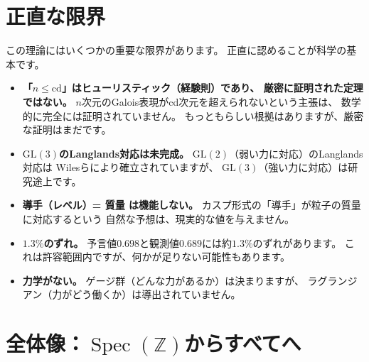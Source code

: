 \documentclass[12pt,a4paper]{article}
\newcommand{\Spec}{\operatorname{Spec}}
\begin{document}
\section{正直な限界}

\begin{honestbox}[科学は正直でなければならない]
この理論にはいくつかの重要な限界があります。
正直に認めることが科学の基本です。

\begin{itemize}
  \item \textbf{「$n \le \mathrm{cd}$」はヒューリスティック（経験則）であり、
    厳密に証明された定理ではない。}
    $n$次元のGalois表現がcd次元を超えられないという主張は、
    数学的に完全には証明されていません。
    もっともらしい根拠はありますが、厳密な証明はまだです。

  \item \textbf{$\mathrm{GL}(3)$のLanglands対応は未完成。}
    $\mathrm{GL}(2)$（弱い力に対応）のLanglands対応は
    Wilesらにより確立されていますが、
    $\mathrm{GL}(3)$（強い力に対応）は研究途上です。

  \item \textbf{導手（レベル）= 質量 は機能しない。}
    カスプ形式の「導手」が粒子の質量に対応するという
    自然な予想は、現実的な値を与えません。

  \item \textbf{$1.3\%$のずれ。}
    予言値$0.698$と観測値$0.689$には約$1.3\%$のずれがあります。
    これは許容範囲内ですが、何かが足りない可能性もあります。

  \item \textbf{力学がない。}
    ゲージ群（どんな力があるか）は決まりますが、
    ラグランジアン（力がどう働くか）は導出されていません。
\end{itemize}
\end{honestbox}

\section{全体像：$\Spec(\mathbb{Z})$からすべてへ}
\end{document}
